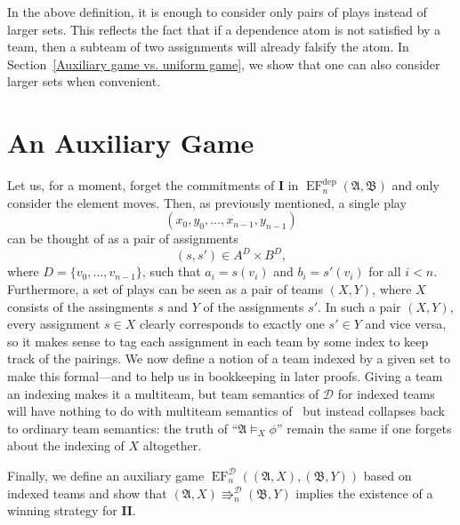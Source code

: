 \documentclass[12pt]{article}
\theoremstyle{definition}
\newcommand{\playerone}{\mathrm{\mathbf{I}}}
\newcommand{\playertwo}{\mathrm{\mathbf{II}}}
\DeclareMathOperator{\EF}{EF}
\newcommand{\EFdep}{\EF^{\mathrm{dep}}}
\newcommand{\A}{\mathfrak{A}}
\newcommand{\B}{\mathfrak{B}}
\newcommand{\posEquiv}{\mathbin{\Rrightarrow}}
\newcommand{\deplog}{\mathcal D}
\begin{document}
In the above definition, it is enough to consider only pairs of plays instead of larger sets. This reflects the fact that if a dependence atom is not satisfied by a team, then a subteam of two assignments will already falsify the atom. In Section~\ref{Auxiliary game vs. uniform game}, we show that one can also consider larger sets when convenient.





\section{An Auxiliary Game}\label{An Auxiliary Game}

Let us, for a moment, forget the commitments of $\playerone$ in $\EFdep_n(\A,\B)$ and only consider the element moves. Then, as previously mentioned, a single play
\[
    (x_0,y_0,\dots,x_{n-1},y_{n-1})
\]
can be thought of as a pair of assignments
\[
    (s,s')\in A^D\times B^D,
\]
where $D = \{v_0,\dots,v_{n-1}\}$, such that $a_i = s(v_i)$ and $b_i = s'(v_i)$ for all $i<n$. Furthermore, a set of plays can be seen as a pair of teams $(X,Y)$, where $X$ consists of the assingments $s$ and $Y$ of the assignments $s'$. In such a pair $(X,Y)$, every assignment $s\in X$ clearly corresponds to exactly one $s'\in Y$ and vice versa, so it makes sense to tag each assignment in each team by some index to keep track of the pairings. We now define a notion of a team indexed by a given set to make this formal---and to help us in bookkeeping in later proofs. Giving a team an indexing makes it a multiteam, but team semantics of $\deplog$ for indexed teams will have nothing to do with multiteam semantics of~\cite{MR3833654} but instead collapses back to ordinary team semantics: the truth of ``$\A\models_X\phi$'' remain the same if one forgets about the indexing of $X$ altogether.

Finally, we define an auxiliary game $\EF^\deplog_n((\A,X),(\B,Y))$ based on indexed teams and show that $(\A,X)\posEquiv^\deplog_n(\B,Y)$ implies the existence of a winning strategy for $\playertwo$.
\end{document}
